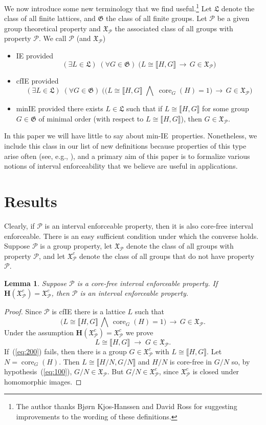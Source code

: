 \documentclass{gen-j-l}
\newcommand{\lb}{\ensuremath{\llbracket}}
\newcommand{\rb}{\ensuremath{\rrbracket}}
\newcommand{\<}{\ensuremath{\langle}}
\renewcommand{\>}{\ensuremath{\rangle}}
\theoremstyle{plain}
\newtheorem{lemma}[theorem]{Lemma}
\theoremstyle{definition}
\theoremstyle{remark}
\numberwithin{theorem}{section}
\numberwithin{claim}{section}
\numberwithin{equation}{section}
\numberwithin{conjecture}{section}
\newcommand{\Meet}{\ensuremath{\bigwedge}}
\newcommand{\core}{\ensuremath{\operatorname{core}}}
\newcommand{\2}{\ensuremath{\mathbf{2}}}
\newcommand{\3}{\ensuremath{\mathbf{3}}}
\newcommand{\sG}{\ensuremath{\mathfrak{X}}}
\newcommand{\G}{\ensuremath{\mathfrak{G}}}
\newcommand{\bH}{\ensuremath{\mathbf{H}}}
\newcommand{\fL}{\ensuremath{\mathfrak{L}}}
\newcommand{\cP}{\ensuremath{\mathcal{P}}}
\newcommand{\IE}{{\small IE}}
\begin{document}
We now introduce some new terminology that we find
useful.\footnote{The author thanks Bj{\o}rn Kjos-Hanssen and David Ross for suggesting
  improvements to the wording of these definitions.}  Let $\fL$
denote the class of all finite lattices, and $\G$ the class of all 
finite groups. Let $\cP$ be a given group theoretical property and $\sG_\cP$
the associated class of all groups with property $\cP$.  
We call $\cP$ (and $\sG_\cP$)
\begin{itemize}
\item 
\acf{IE} provided
\[
(\exists L\in \fL)  \; (\forall G \in \G) \; \bigl(L\cong \lb H,G \rb \, \longrightarrow \, G
\in \sG_\cP \bigr)
\]
\item
\acf{cfIE} provided
\[
(\exists L\in \fL)  \; (\forall G\in \G) \; \bigl(\bigl(L\cong \lb H,G \rb \; \Meet \; \core_G(H)=1\bigr)
\, \longrightarrow \, G  \in \sG_\cP \bigr)
\]
\item 
\acf{minIE}
provided there exists $L\in \fL$ such that if $L\cong \lb H,G \rb$ for some
group $G\in \G$ of minimal order (with respect to $L\cong \lb H,G \rb$), then
$G \in \sG_\cP$.
\end{itemize}
In this paper we will have little to
say about min-\IE\ properties.  Nonetheless, we include this class in our list
of new definitions because properties of this type arise often (see, e.g.,
\cite{Lucchini:1994a}), and a primary aim of this paper is to formalize
various notions of interval enforceability that we believe are
useful in applications. 

\section{Results}
Clearly, if $\cP$ is an interval enforceable property, then it is also
core-free interval enforceable.  There is an easy
sufficient condition under which the converse holds.  
Suppose $\cP$ is a group property, let $\sG_{\cP}$  denote the
class of all groups with property $\cP$, and let
 $\sG_{\cP}^c$ denote the class of all groups that do not have property $\cP$.
\begin{lemma}
\label{lemma-wjd-2}
Suppose $\cP$ is a core-free interval enforceable property.  
If $\bH(\sG_{\cP}^c) = \sG_{\cP}^c$, then $\cP$ is an interval enforceable property.
\end{lemma}
\begin{proof}
Since $\cP$ is \acs{cfIE} there is a lattice $L$ such that
\begin{equation}
  \label{eq:100}
\bigl(L \cong \lb H,G \rb \, \Meet \, \core_G(H)=1\bigr) \, \longrightarrow \, G\in \sG_\cP.
\end{equation}
Under the assumption $\bH(\sG_\cP^c) = \sG_\cP^c$ we prove
\begin{equation}
  \label{eq:200}
L \cong \lb H,G \rb \; \longrightarrow \; G\in \sG_\cP.
\end{equation}
If~(\ref{eq:200}) fails, then there is a
group $G\in \sG_{\cP}^c$ with $L\cong \lb H,G \rb$.  Let $N = \core_G(H)$.  Then $L \cong
\lb H/N,G/N \rb$ and $H/N$ is core-free in $G/N$ so, by hypothesis~(\ref{eq:100}),
$G/N \in \sG_\cP$.  But $G/N \in \sG_{\cP}^c$, since $\sG_{\cP}^c$ is closed under homomorphic images.
\end{proof}
\end{document}
